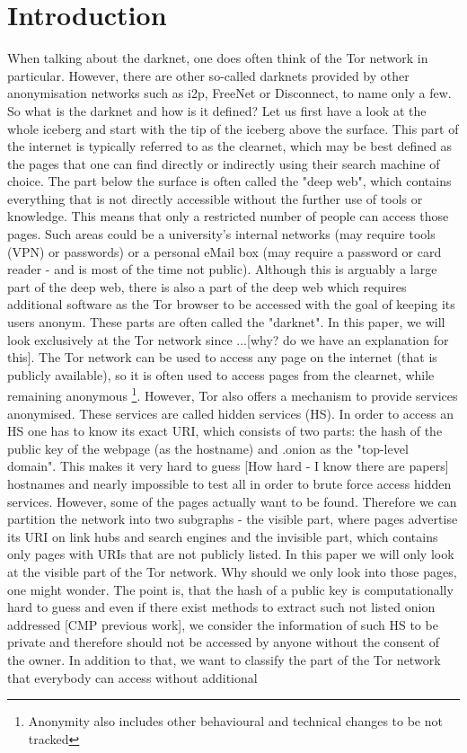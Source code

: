 \documentclass[USenglish,oneside,twocolumn]{article}
\begin{document}
\maketitle
\section{Introduction}
When talking about the darknet, one does often think of the Tor network in particular. However, there are other so-called darknets provided by other anonymisation networks such as i2p, FreeNet or Disconnect, to name only a few. So what is the darknet and how is it defined? Let us first have a look at the whole iceberg and start with the tip of the iceberg above the surface. This part of the internet is typically referred to as the clearnet, which may be best defined as the pages that one can find directly or indirectly using their search machine of choice. The part below the surface is often called the "deep web", which contains everything that is not directly accessible without the further use of tools or knowledge. This means that only a restricted number of people can access those pages. Such areas could be a university's internal networks (may require tools (VPN) or passwords) or a personal eMail box (may require a password or card reader - and is most of the time not public). Although this is arguably a large part of the deep web, there is also a part of the deep web which requires additional software as the Tor browser to be accessed with the goal of keeping its users anonym. These parts are often called the "darknet". In this paper, we will look exclusively at the Tor network since ...[why? do we have an explanation for this]. The Tor network can be used to access any page on the internet (that is publicly available), so it is often used to access pages from the clearnet, while remaining anonymous \footnote{Anonymity also includes other behavioural and technical changes to be not tracked}. However, Tor also offers a mechanism to provide services anonymised. These services are called hidden services (HS).  In order to access an HS one has to know its exact URI, which consists of two parts: the hash of the public key of the webpage (as the hostname) and .onion as the "top-level domain". This makes it very hard to guess [How hard - I know there are papers] hostnames and nearly impossible to test all in order to brute force access hidden services. However, some of the pages actually want to be found. Therefore we can partition the network into two subgraphs - the visible part, where pages advertise its URI on link hubs and search engines and the invisible part, which contains only pages with URIs that are not publicly listed. In this paper we will only look at the visible part of the Tor network. Why should we only look into those pages, one might wonder. The point is, that the hash of a public key is computationally hard to guess and even if there exist methods to extract such not listed onion addressed [CMP previous work], we consider the information of such HS to be private and therefore should not be accessed by anyone without the consent of the owner. In addition to that, we want to classify the part of the Tor network that everybody can access without additional 
\end{document}
